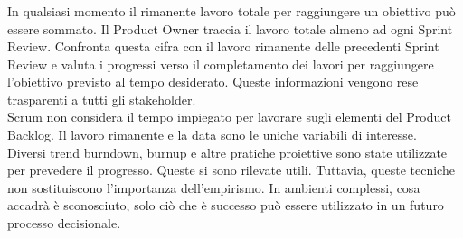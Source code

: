\subsubsection*{\color{SteelBlue}{Monitorare i Progressi verso un Obiettivo}} %
\label{ssub:monitoring_progress_toward_a_great}
In qualsiasi momento il rimanente lavoro totale per raggiungere un obiettivo pu\`o essere sommato. Il 
Product Owner traccia il lavoro totale almeno ad ogni Sprint Review. Confronta questa cifra con il 
lavoro rimanente delle precedenti Sprint Review e valuta i progressi verso il completamento dei 
lavori per raggiungere l'obiettivo previsto al tempo desiderato. Queste informazioni vengono rese trasparenti a 
tutti gli stakeholder.\newline
\\Scrum non considera il tempo impiegato per lavorare sugli elementi del Product Backlog. Il lavoro 
rimanente e la data sono le uniche  variabili di interesse. \newline
\\Diversi trend burndown, burnup e altre pratiche proiettive sono state utilizzate per prevedere il 
progresso. Queste si sono rilevate utili. Tuttavia, queste tecniche non sostituiscono l'importanza 
dell'empirismo. In ambienti complessi, cosa accadr\`a \`e sconosciuto, solo ci\`o che \`e successo pu\`o 
essere utilizzato in un futuro processo decisionale.


